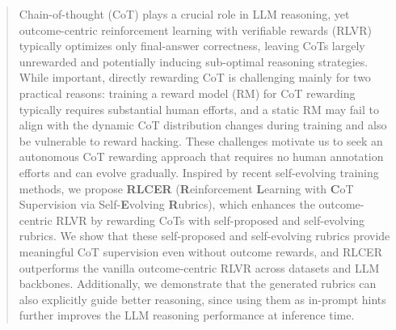 \begin{abstract}
Chain-of-thought (CoT) plays a crucial role in LLM reasoning, yet outcome-centric reinforcement learning with verifiable rewards (RLVR) typically optimizes only final-answer correctness, leaving CoTs largely unrewarded and potentially inducing sub-optimal reasoning strategies. 
While important, directly rewarding CoT is challenging mainly for two practical reasons: training a reward model (RM) for CoT rewarding typically requires substantial human efforts, and a static RM may fail to align with the dynamic CoT distribution changes during training and also be vulnerable to reward hacking. 
These challenges motivate us to seek an autonomous CoT rewarding approach that requires no human annotation efforts and can evolve gradually. 
Inspired by recent self-evolving training methods, we propose \textbf{RLCER} (\textbf{R}einforcement \textbf{L}earning with \textbf{C}oT Supervision via Self-\textbf{E}volving \textbf{R}ubrics), which enhances the outcome-centric RLVR by rewarding CoTs with self-proposed and self-evolving rubrics.
We show that these self-proposed and self-evolving rubrics provide meaningful CoT supervision even without outcome rewards, and RLCER outperforms the vanilla outcome-centric RLVR across datasets and LLM backbones. 
Additionally, we demonstrate that the generated rubrics can also explicitly guide better reasoning, since using them as in-prompt hints further improves the LLM reasoning performance at inference time. 
\end{abstract}

